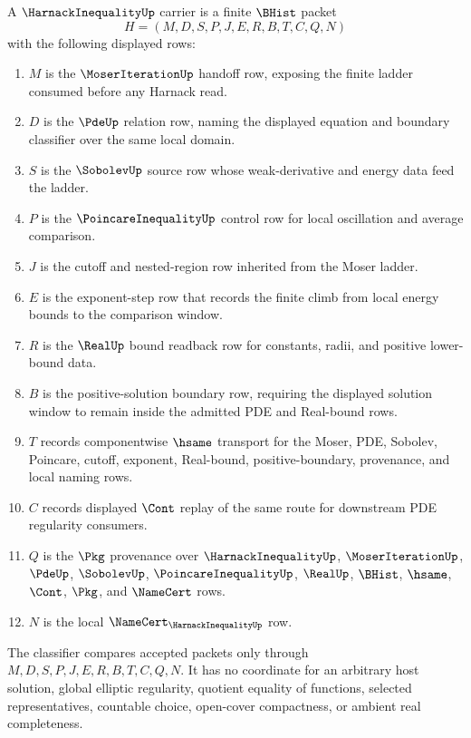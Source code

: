 \begin{definition}
\label{def:harnack-inequality-carrier}
A $\HarnackInequalityUp$ carrier is a finite $\BHist$ packet
$$
H=(M,D,S,P,J,E,R,B,T,C,Q,N)
$$
with the following displayed rows:
\begin{enumerate}
\item $M$ is the $\MoserIterationUp$ handoff row, exposing the finite ladder consumed before any Harnack read.
\item $D$ is the $\PdeUp$ relation row, naming the displayed equation and boundary classifier over the same local domain.
\item $S$ is the $\SobolevUp$ source row whose weak-derivative and energy data feed the ladder.
\item $P$ is the $\PoincareInequalityUp$ control row for local oscillation and average comparison.
\item $J$ is the cutoff and nested-region row inherited from the Moser ladder.
\item $E$ is the exponent-step row that records the finite climb from local energy bounds to the comparison window.
\item $R$ is the $\RealUp$ bound readback row for constants, radii, and positive lower-bound data.
\item $B$ is the positive-solution boundary row, requiring the displayed solution window to remain inside the admitted PDE and Real-bound rows.
\item $T$ records componentwise $\hsame$ transport for the Moser, PDE, Sobolev, Poincare, cutoff, exponent, Real-bound, positive-boundary, provenance, and local naming rows.
\item $C$ records displayed $\Cont$ replay of the same route for downstream PDE regularity consumers.
\item $Q$ is the $\Pkg$ provenance over $\HarnackInequalityUp$, $\MoserIterationUp$, $\PdeUp$, $\SobolevUp$, $\PoincareInequalityUp$, $\RealUp$, $\BHist$, $\hsame$, $\Cont$, $\Pkg$, and $\NameCert$ rows.
\item $N$ is the local $\NameCert_{\HarnackInequalityUp}$ row.
\end{enumerate}
The classifier compares accepted packets only through $M,D,S,P,J,E,R,B,T,C,Q,N$. It has no coordinate for an arbitrary host solution, global elliptic regularity, quotient equality of functions, selected representatives, countable choice, open-cover compactness, or ambient real completeness.
\end{definition}


